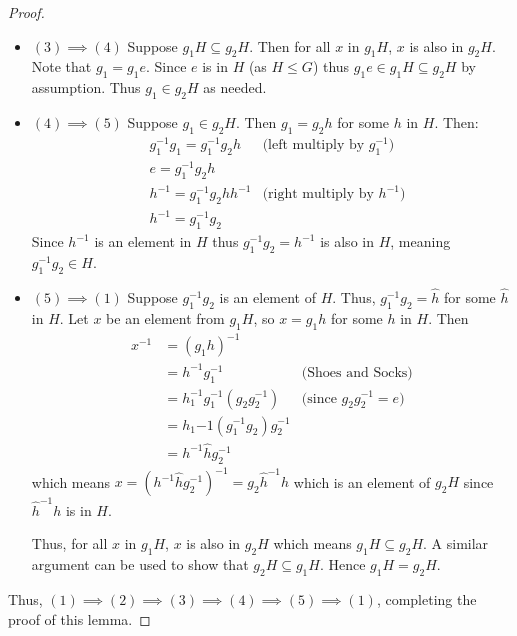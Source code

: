 \begin{proof}
\begin{itemize}
        \item $\boxed{(3) \implies (4)}$
        Suppose $g_1H \subseteq g_2H$. Then for all $x$ in $g_1H$, $x$ is also in $g_2H$. Note that $g_1 = g_1e$. Since $e$ is in $H$ (as $H \leq G$) thus $g_1e \in g_1H \subseteq g_2H$ by assumption. Thus $g_1 \in g_2H$ as needed.

        \item $\boxed{(4) \implies (5)}$
        Suppose $g_1 \in g_2H$. Then $g_1 = g_2h$ for some $h$ in $H$. Then:
        \begin{align*}
            &g_1^{-1}g_1 = g_1^{-1}g_2h & \text{(left multiply by } g_1^{-1} \text{)}\\
            &e = g_1^{-1}g_2h\\
            &h^{-1} = g_1^{-1}g_2hh^{-1} & \text{(right multiply by } h^{-1} \text{)}\\
            &h^{-1} = g_1^{-1}g_2
        \end{align*}
        Since $h^{-1}$ is an element in $H$ thus $g_1^{-1}g_2 = h^{-1}$ is also in $H$, meaning $g_1^{-1}g_2 \in H$.

        \item $\boxed{(5) \implies (1)}$
        Suppose $g_1^{-1}g_2$ is an element of $H$. Thus, $g_1^{-1}g_2 = \hat{h}$ for some $\hat{h}$ in $H$. Let $x$ be an element from $g_1H$, so $x = g_1h$ for some $h$ in $H$. Then
        \begin{align*}
        x^{-1} &= (g_1h)^{-1}\\
        &= h^{-1}g_1^{-1} & \text{(Shoes and Socks)}\\
        &= h_1^{-1}g_1^{-1}(g_2g_2^{-1}) & \text{(since }g_2g_2^{-1} = e \text{)}\\
        &= h_1{-1}(g_1^{-1}g_2)g_2^{-1}\\
        &= h^{-1}\hat{h}g_2^{-1}
        \end{align*}
        which means $x = \left(h^{-1}\hat{h}g_2^{-1}\right)^{-1} = g_2\hat{h}^{-1}h$ which is an element of $g_2H$ since $\hat{h}^{-1}h$ is in $H$.

        Thus, for all $x$ in $g_1H$, $x$ is also in $g_2H$ which means $g_1H \subseteq g_2H$. A similar argument can be used to show that $g_2H \subseteq g_1H$. Hence $g_1H = g_2H$.
    \end{itemize}

    Thus, $(1) \implies (2) \implies (3) \implies (4) \implies (5) \implies (1)$, completing the proof of this lemma.
\end{proof}

